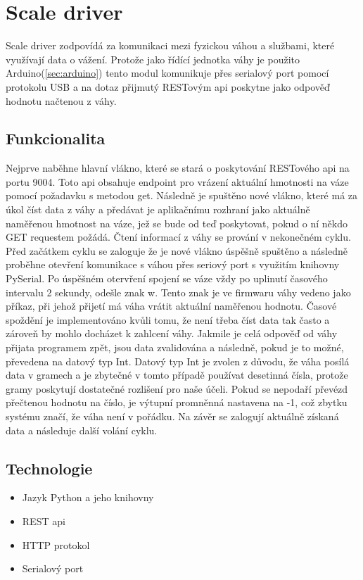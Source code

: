 \section{Scale driver}\label{sec:scale-driver}
Scale driver zodpovídá za komunikaci mezi fyzickou váhou a službami, které využívají data o vážení.\newline
Protože jako řídící jednotka váhy je použito Arduino(\ref{sec:arduino}) tento modul komunikuje přes serialový port pomocí protokolu USB a na dotaz přijmutý RESTovým api poskytne jako odpověď hodnotu načtenou z váhy.

\subsection*{Funkcionalita}
Nejprve naběhne hlavní vlákno, které se stará o poskytování RESTového api na portu 9004.
Toto api obsahuje endpoint pro vrázení aktuální hmotnosti na váze pomocí požadavku s metodou get.
Následně je spuštěno nové vlákno, které má za úkol číst data z váhy a předávat je aplikačnímu rozhraní jako aktuálně naměřenou hmotnost na váze, jež se bude od teď poskytovat, pokud o ní někdo GET requestem požádá.
Čtení informací z váhy se prování v nekonečném cyklu.
Před začátkem cyklu se zaloguje že je nové vlákno úspěšně spuštěno a následně proběhne otevření komunikace s váhou přes seriový port s využitím knihovny PySerial.
Po úspěšném otervření spojení se váze vždy po uplinutí časového intervalu 2 sekundy, odešle znak w.
Tento znak je ve firmwaru váhy vedeno jako příkaz, při jehož přijetí má váha vrátit aktuální naměřenou hodnotu.
Časové spoždění je implementováno kvůli tomu, že není třeba číst data tak často a zároveň by mohlo docházet k zahlcení váhy.
Jakmile je celá odpověď od váhy přijata programem zpět, jsou data zvalidována a následně, pokud je to možné, převedena na datový typ Int.
Datový typ Int je zvolen z důvodu, že váha posílá data v gramech a je zbytečné v tomto případě používat desetinná čísla, protože gramy poskytují dostatečné rozlišení pro naše účeli.
Pokud se nepodaří převézd přečtenou hodnotu na číslo, je výtupní promněnná nastavena na -1, což zbytku systému značí, že váha není v pořádku.
Na závěr se zalogují aktuálně získaná data a následuje další volání cyklu.

\subsection*{Technologie}
\begin{itemize}
    \item Jazyk Python a jeho knihovny
    \item REST api
    \item HTTP protokol
    \item Serialový port
\end{itemize}

